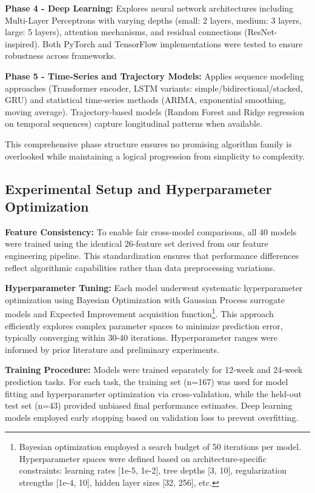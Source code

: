\documentclass[conference]{IEEEtran}
\begin{document}
\textbf{Phase 4 - Deep Learning:} Explores neural network architectures including Multi-Layer Perceptrons with varying depths (small: 2 layers, medium: 3 layers, large: 5 layers), attention mechanisms, and residual connections (ResNet-inspired). Both PyTorch and TensorFlow implementations were tested to ensure robustness across frameworks.

\textbf{Phase 5 - Time-Series and Trajectory Models:} Applies sequence modeling approaches (Transformer encoder, LSTM variants: simple/bidirectional/stacked, GRU) and statistical time-series methods (ARIMA, exponential smoothing, moving average). Trajectory-based models (Random Forest and Ridge regression on temporal sequences) capture longitudinal patterns when available.

This comprehensive phase structure ensures no promising algorithm family is overlooked while maintaining a logical progression from simplicity to complexity.

\subsection{Experimental Setup and Hyperparameter Optimization}

\textbf{Feature Consistency:} To enable fair cross-model comparisons, all 40 models were trained using the identical 26-feature set derived from our feature engineering pipeline. This standardization ensures that performance differences reflect algorithmic capabilities rather than data preprocessing variations.

\textbf{Hyperparameter Tuning:} Each model underwent systematic hyperparameter optimization using Bayesian Optimization with Gaussian Process surrogate models and Expected Improvement acquisition function\footnote{Bayesian optimization employed a search budget of 50 iterations per model. Hyperparameter spaces were defined based on architecture-specific constraints: learning rates [1e-5, 1e-2], tree depths [3, 10], regularization strengths [1e-4, 10], hidden layer sizes [32, 256], etc.}. This approach efficiently explores complex parameter spaces to minimize prediction error, typically converging within 30-40 iterations. Hyperparameter ranges were informed by prior literature and preliminary experiments.

\textbf{Training Procedure:} Models were trained separately for 12-week and 24-week prediction tasks. For each task, the training set (n=167) was used for model fitting and hyperparameter optimization via cross-validation, while the held-out test set (n=43) provided unbiased final performance estimates. Deep learning models employed early stopping based on validation loss to prevent overfitting.
\end{document}
